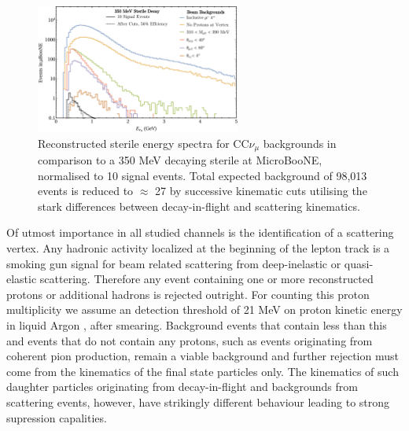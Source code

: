 \documentclass[11pt, a4paper]{article}
\def\muboone{MicroBooNE}
\begin{document}
\begin{figure}[h]
\center
\includegraphics[width=0.6\textwidth,clip,trim=0 0 0 0]{figures/mu_pi_cutflow.pdf}

\caption{\label{fig:mu_pi_cutflow} Reconstructed sterile energy spectra for
CC$\nu_\mu$ backgrounds in comparison to a 350 MeV decaying sterile at
\muboone, normalised to 10 signal events. Total expected background of 98,013
events is reduced to $\approx$ 27 by successive kinematic cuts utilising
the stark differences between decay-in-flight and scattering kinematics. }
\end{figure}

Of utmost importance in all studied channels is the identification of a scattering vertex. Any hadronic activity
localized at the beginning of the lepton track is a smoking gun signal for beam
related scattering from deep-inelastic or quasi-elastic scattering. Therefore
any event containing one or more reconstructed protons or additional hadrons is
rejected outright. For counting this proton multiplicity we assume an detection
threshold of 21 MeV on proton kinetic energy in liquid Argon \cite{Acciarri:2014gev}, after smearing.
Background events that contain less than this and events that do not contain
any protons, such as events originating from coherent pion production, remain a
viable background and further rejection must come from the kinematics of the
final state particles only. The kinematics of such daughter particles originating from decay-in-flight and backgrounds from scattering events, however,  have strikingly different behaviour leading to strong supression capalities. \\
\end{document}
